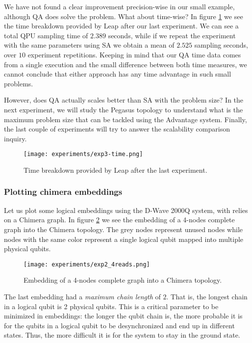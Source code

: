 We have not found a clear improvement precision-wise in our small example, although QA does solve the problem. What about time-wise? In figure \ref{fig:exp3-time} we see the time breakdown provided by Leap after our last experiment. We can see a total QPU sampling time of $2.389$ seconds, while if we repeat the experiment with the same parameters using SA we obtain a mean of $2.525$ sampling seconds, over $10$ experiment repetitions. Keeping in mind that our QA time data comes from a single execution and the small difference between both time measures, we cannot conclude that either approach has any time advantage in such small problems.

However, does QA actually scales better than SA with the problem size? In the next experiment, we will study the Pegasus topology to understand what is the maximum problem size that can be tackled using the Advantage system. Finally, the last couple of experiments will try to answer the scalability comparison inquiry.

\begin{figure}[h]
	\texttt{[image: experiments/exp3-time.png]}
	\centering
	\caption{Time breakdown provided by Leap after the last experiment.}
	\label{fig:exp3-time}
\end{figure}


\subsubsection{Plotting chimera embeddings}


Let us plot some logical embeddings using the D-Wave 2000Q system, with relies on a Chimera graph. In figure \ref{fig:exp2_4reads} we see the embedding of a 4-nodes complete graph into the Chimera topology. The grey nodes represent unused nodes while nodes with the same color represent a single logical qubit mapped into multiple physical qubits.

\begin{figure}[h]
	\texttt{[image: experiments/exp2\_4reads.png]}
	\centering
	\caption{Embedding of a 4-nodes complete graph into a Chimera topology.}
	\label{fig:exp2_4reads}
\end{figure}

The last embedding had a \emph{maximum chain length} of $2$. That is, the longest chain in a logical qubit is 2 physical qubits. This is a critical parameter to be minimized in embeddings: the longer the qubit chain is, the more probable it is for the qubits in a logical qubit to be desynchronized and end up in different states. Thus, the more difficult it is for the system to stay in the ground state.

